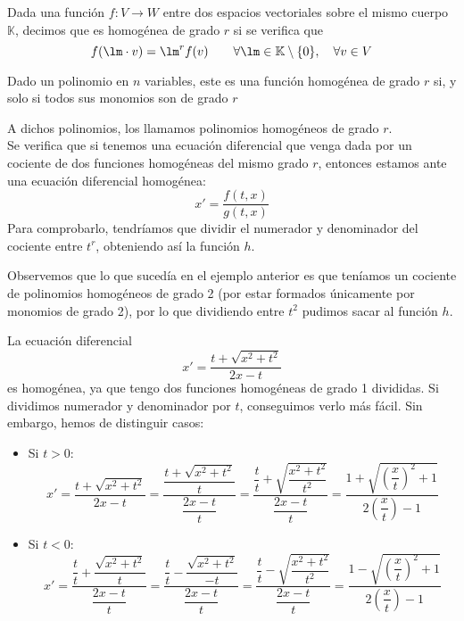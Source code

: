 \begin{definicion}
    Dada una función $f:V\rightarrow W$ entre dos espacios vectoriales sobre el mismo cuerpo $\mathbb{K}$, decimos que es homogénea de grado $r$ si se verifica que
    \begin{equation*}
        f(\lm\cdot v) = \lm^r f(v) \qquad \forall \lm\in \mathbb{K}\setminus \{0\}, \quad \forall v\in V
    \end{equation*}
\end{definicion}

\begin{prop}
    Dado un polinomio en $n$ variables, este es una función homogénea de grado $r$ si, y solo si todos sus monomios son de grado $r$
\end{prop}
A dichos polinomios, los llamamos polinomios homogéneos de grado $r$.\\

Se verifica que si tenemos una ecuación diferencial que venga dada por un cociente de dos funciones homogéneas del mismo grado $r$, entonces estamos ante una ecuación diferencial homogénea:
\begin{equation*}
    x' = \dfrac{f(t,x)}{g(t,x)}
\end{equation*}
Para comprobarlo, tendríamos que dividir el numerador y denominador del cociente entre $t^r$, obteniendo así la función $h$.

Observemos que lo que sucedía en el ejemplo anterior es que teníamos un cociente de polinomios homogéneos de grado 2 (por estar formados únicamente por monomios de grado 2), por lo que dividiendo entre $t^2$ pudimos sacar al función $h$.

\begin{ejemplo}
    La ecuación diferencial
    \begin{equation*}
        x' = \dfrac{t + \sqrt{x^2+t^2}}{2x-t}
    \end{equation*}
    es homogénea, ya que tengo dos funciones homogéneas de grado 1 divididas. Si dividimos numerador y denominador por $t$, conseguimos verlo más fácil. Sin embargo, hemos de distinguir casos:
    \begin{itemize}
        \item Si $t>0$:
            \begin{equation*}
                x' = \dfrac{t + \sqrt{x^2+t^2}}{2x-t} = \dfrac{\dfrac{t + \sqrt{x^2+t^2}}{t}}{\dfrac{2x-t}{t}}  = \dfrac{\dfrac{t}{t}+\sqrt{\dfrac{x^2+t^2}{t^2}}}{\dfrac{2x-t}{t}} =\dfrac{1+\sqrt{{\left(\dfrac{x}{t}\right)}^{2}+1}}{2\left(\dfrac{x}{t}\right)-1}
            \end{equation*}
        \item Si $t<0$:
            \begin{equation*}
                x' = \dfrac{\dfrac{t}{t}+\dfrac{\sqrt{x^2+t^2}}{t}}{\dfrac{2x-t}{t}} = \dfrac{\dfrac{t}{t}-\dfrac{\sqrt{x^2+t^2}}{-t}}{\dfrac{2x-t}{t}} = \dfrac{\dfrac{t}{t}-\sqrt{\dfrac{x^2+t^2}{t^2}}}{\dfrac{2x-t}{t}} =\dfrac{1-\sqrt{{\left(\dfrac{x}{t}\right)}^{2}+1}}{2\left(\dfrac{x}{t}\right)-1}
            \end{equation*}
    \end{itemize}
\end{ejemplo}


